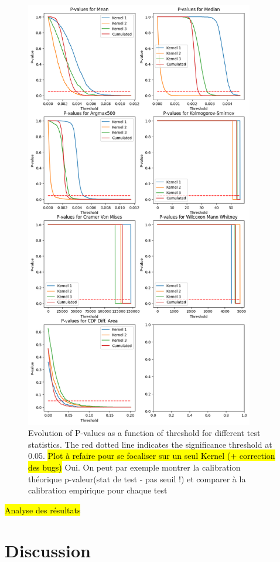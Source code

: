\documentclass{article}
\newcommand{\dm}[1]{{\color{mulberry} #1}}
\begin{document}
\begin{figure}[H]
\centering
\includegraphics[width=10cm]{img/p-values.png}
\caption{Evolution of P-values as a function of threshold for different test statistics. The red dotted line indicates the significance threshold at 0.05. \hl{Plot à refaire pour se focaliser sur un seul Kernel (+ correction des bugs)} \dm{Oui. On peut par exemple montrer la calibration théorique p-valeur(stat de test - pas seuil !) et comparer à la calibration empirique pour chaque test }}


\label{fig:pvalues}
\end{figure}

\hl{Analyse des résultats}


\section{Discussion}
\end{document}
